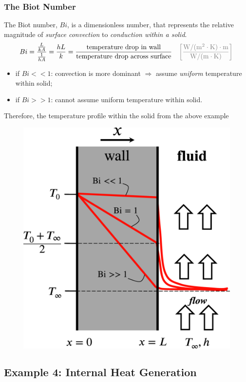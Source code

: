 \documentclass[12pt, a4paper]{article}
\begin{document}
\subsubsection{The Biot Number}
The Biot number, $Bi$, is a dimensionless number, that represents the relative magnitude of \textit{surface convection} to \textit{conduction within a solid}.
\[ 
    Bi = \frac{\frac{L}{kA}}{\frac{1}{hA}} = \frac{hL}{k} = \frac{\text{temperature drop in wall}}{\text{temperature drop across surface}}   \quad \mathrm{{\color{gray} \bigg[ \frac{ W/(m^2\cdot K) \cdot m}{W/(m\cdot K)}\bigg]}}
\]
\begin{itemize}
    \item if $Bi<<1$: convection is more dominant $\Rightarrow$ assume \textit{uniform} temperature within solid;
    \item if $Bi>>1$: cannot assume uniform temperature within solid.
\end{itemize}
Therefore, the temperature profile within the solid from the above example
\begin{figure}[H]
    \centering
    \includegraphics[width=.4\textwidth]{img/conduction_convection_solution.eps}
\end{figure}

\subsection{Example 4: Internal Heat Generation}
\end{document}
